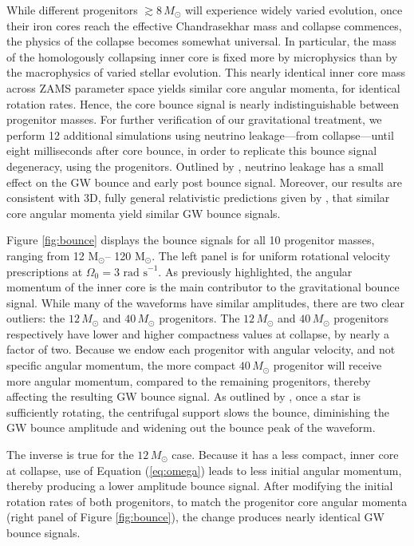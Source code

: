 \documentclass[twocolumn,times]{aastex62}  %
\newcommand{\Msun}{\ensuremath{\mathrm{M}_\odot}\xspace}
\begin{document}
While different progenitors $\gtrsim$$8\, M_\odot$ will experience widely varied evolution, once their iron cores reach the effective Chandrasekhar mass \citep{baron:1990} and collapse commences, the physics of the collapse becomes somewhat universal.
In particular, the mass of the homologously collapsing inner core is fixed more by microphysics than by the macrophysics of varied stellar evolution. 
This nearly identical inner core mass across ZAMS parameter space yields similar core angular momenta, for identical rotation rates.  Hence, the core bounce signal is nearly indistinguishable between progenitor masses.  For further verification of our gravitational treatment, we perform 12 additional simulations using neutrino leakage---from collapse---until eight milliseconds after core bounce, in order to replicate this bounce signal degeneracy, using the \citet{Suk:2016} progenitors.  Outlined by \citet{ott:2012}, neutrino leakage has a small effect on the GW bounce and early post bounce signal.  
Moreover, our results are consistent with 3D, fully general relativistic predictions given by \citet{ott:2012}, that similar core angular momenta yield similar GW bounce signals.  

Figure \ref{fig:bounce} displays the bounce signals for all 10 progenitor masses, ranging from 12 \Msun -- 120 \Msun.  The left panel is for uniform rotational velocity prescriptions at $\Omega_0 = 3\text{ rad s}^{-1}$.  As previously highlighted, the angular momentum of the inner core is the main contributor to the gravitational bounce signal.  While many of the waveforms have similar amplitudes, there are two clear outliers: the $12\,M_\odot$ and $40\,M_\odot$ progenitors.  The $12\,M_\odot$ and $40\,M_\odot$ progenitors respectively have lower and higher compactness values at collapse, by nearly a factor of two.  Because we endow each progenitor with angular velocity, and not specific angular momentum, the more compact $40\,M_\odot$ progenitor will receive more angular momentum, compared to the remaining progenitors, thereby affecting the resulting GW bounce signal.  As outlined by \citet{dimm:2008}, once a star is sufficiently rotating, the centrifugal support slows the bounce, diminishing the GW bounce amplitude and widening out the bounce peak of the waveform.  

The inverse is true for the $12\,M_\odot$ case.  Because it has a less compact, inner core at collapse, use of Equation (\ref{eq:omega}) leads to less initial angular momentum, thereby producing a lower amplitude bounce signal.  After modifying the initial rotation rates of both progenitors, to match the progenitor core angular momenta (right panel of Figure \ref{fig:bounce}), the change produces nearly identical GW bounce signals.  
\end{document}
